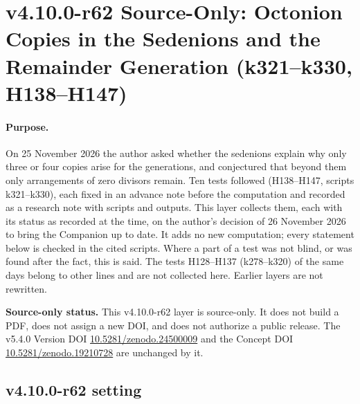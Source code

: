 
\clearpage
\section*{v4.10.0-r62 Source-Only: Octonion Copies in the Sedenions and the Remainder Generation (k321--k330, H138--H147)}
\label{sec:v4100-r62-sedenion-copies}

\paragraph{Purpose.}
On 25 November 2026 the author asked whether the sedenions explain why only three or four copies arise for the generations, and conjectured that
beyond them only arrangements of zero divisors remain.  Ten tests followed (H138--H147, scripts k321--k330), each fixed in an advance note before
the computation and recorded as a research note with scripts and outputs.  This layer collects them, each with its status as recorded at the time,
on the author's decision of 26 November 2026 to bring the Companion up to date.  It adds no new computation; every statement below is checked in
the cited scripts.  Where a part of a test was not blind, or was found after the fact, this is said.  The tests H128--H137 (k278--k320) of the same
days belong to other lines and are not collected here.  Earlier layers are not rewritten.

\noindent\textbf{Source-only status.}
This v4.10.0-r62 layer is source-only.  It does not build a PDF, does not assign a new DOI,
and does not authorize a public release.  The v5.4.0 Version DOI
\href{https://doi.org/10.5281/zenodo.24500009}{10.5281/zenodo.24500009} and the Concept DOI
\href{https://doi.org/10.5281/zenodo.19210728}{10.5281/zenodo.19210728} are unchanged by it.

\subsection*{v4.10.0-r62 setting}
\label{subsec:v4100-r62-setting}

